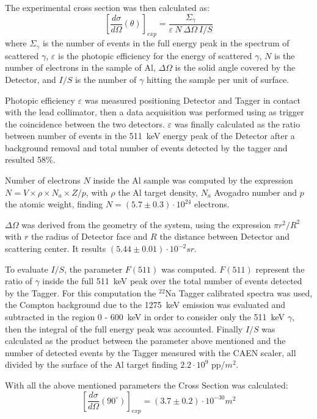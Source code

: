 The experimental cross section was then calculated as:
\begin{equation*}
	\left[\frac{d\sigma}{d\Omega}(\theta)\right]_{exp}=\frac{\Sigma_\gamma}{\varepsilon\ N\ \Delta\Omega\ I/S}
\end{equation*}
 where $\Sigma_\gamma$ is the number of events in the full energy peak in the spectrum of scattered $\gamma$, $\varepsilon$ is the photopic efficiency for the energy of scattered  $\gamma$, $N$ is the number of electrons in the sample of Al, $\Delta\Omega$ is the solid angle covered by the Detector, and $I/S$ is the number of $\gamma$ hitting the sample per unit of surface. 
 
 Photopic efficiency $\varepsilon$ was measured positioning Detector and Tagger in contact with the lead collimator, then a data acquisition was performed using as trigger the coincidence between the two detectors.
 $\varepsilon$ was finally calculated as the ratio between number of events in the 511~keV energy peak of the Detector after a background removal and total number of events detected by the tagger and resulted 58\%.
 
 Number of electrons $N$ inside the Al sample was computed by the expression $N=V\times \rho\times N_a\times Z/p$, with $\rho$ the Al target density, $N_a$ Avogadro number and $p$  the atomic weight, finding $N=(5.7 \pm 0.3)\cdot10^{24}$ electrons.
 
  $\Delta\Omega$ was derived from the geometry of the system, using the expression $\pi r^2/R^2$ with $r$ the radius of Detector face and $R$ the distance between Detector and scattering center. It results $(5.44\pm0.01)\cdot 10^{-2} sr$. 
  
  To evaluate $I/S$, the parameter $F(511)$ was computed. $F(511)$ represent the ratio of $\gamma$ inside the full 511~keV peak over the total number of events detected by the Tagger. For this computation the $^{22}$Na Tagger calibrated spectra was used, the Compton background due to the 1275~keV emission was evaluated and subtracted in the region 0 - 600~keV in order to consider only the 511~keV $\gamma$, then the integral of the full energy peak was accounted. Finally $I/S$ was calculated as the product between the parameter above mentioned and the number of detected events by the Tagger measured with the CAEN scaler, all divided by the surface of the Al target finding $2.2\cdot10^{9}$ pp/$m^2$.
  
  With all the above mentioned parameters the Cross Section was calculated:
  \begin{equation*}
  	\left[\frac{d\sigma}{d\Omega}(90^{\circ})\right]_{exp}=(3.7\pm0.2)\cdot 10^{-30} m^{2}
  \end{equation*}
  
  
 
